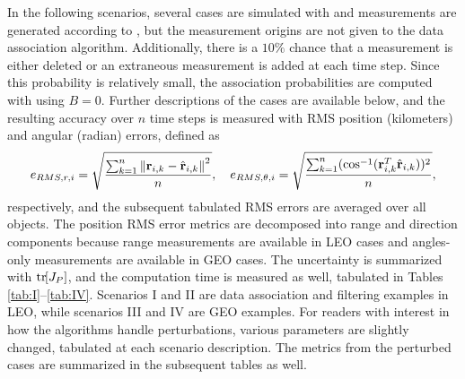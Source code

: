 In the following scenarios, several cases are simulated with  and measurements are generated according to , but the measurement origins are not given to the data association algorithm.
Additionally, there is a $10\%$ chance that a measurement is either deleted or an extraneous measurement is added at each time step.
Since this probability is relatively small, the association probabilities are computed with  using $B=0$.
Further descriptions of the cases are available below, and the resulting accuracy over $n$ time steps is measured with RMS position (kilometers) and angular (radian) errors, defined as
\begin{align}
{e}_{RMS,r,i}=\sqrt{\frac{\sum_{k=1}^n\left\| \mathbf{r}_{i,k}-\hat{\mathbf{r}}_{i,k} \right\|^2}{n}}
, \quad
{e}_{RMS,\theta,i}=\sqrt{\frac{\sum_{k=1}^n(\cos^{-1}(\mathbf{r}_{i,k}^T\hat{\mathbf{r}}_{i,k}))^2}{n}}
,
\end{align}
respectively, and the subsequent tabulated RMS errors are averaged over all objects. 
The position RMS error metrics are decomposed into range and direction components because range measurements are available in LEO cases and angles-only measurements are available in GEO cases.
The uncertainty is summarized with $\mathrm{tr}\negthickspace\left[ J_P \right]$, and the computation time is measured as well, tabulated in Tables \ref{tab:I}--\ref{tab:IV}.
Scenarios I and II are data association and filtering examples in LEO, while scenarios III and IV are GEO examples.
For readers with interest in how the algorithms handle perturbations, various parameters are slightly changed, tabulated at each scenario description.
The metrics from the perturbed cases are summarized in the subsequent tables as well.


